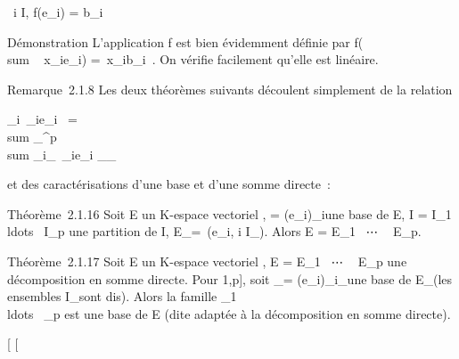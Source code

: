 \documentclass[]{article}
\begin{document}
\forall~i \in I, f(e\_i) = b\_i~

Démonstration L'application f est bien évidemment définie par
f(\\sum ~
x\_ie\_i) =\
\sum  x\_ib\_i~. On vérifie
facilement qu'elle est linéaire.

Remarque~2.1.8 Les deux théorèmes suivants découlent simplement de la
relation

\sum \_i\inI\alpha~\_ie\_i~ =
\\sum
\_^p\underbrace
\\sum
\_i\inI\_\jmath\alpha~\_ie\_i \_\inE\_\jmath

et des caractérisations d'une base et d'une somme directe~:

Théorème~2.1.16 Soit E un K-espace vectoriel ,  =
(e\_i)\_i\inI une base de E, I = I\_1
\cup\\ldots~ \cup
I\_p une partition de I, E\_\jmath =\
\mathrmVect(e\_i, i \in I\_\jmath). Alors
E = E\_1 \oplus~⋯ \oplus~ E\_p.

Théorème~2.1.17 Soit E un K-espace vectoriel , E = E\_1
\oplus~⋯ \oplus~ E\_p une décomposition en somme
directe. Pour \jmath \in {[}1,p{]}, soit \_\jmath =
(e\_i)\_i\inI\_\jmath une base de E\_\jmath (les
ensembles I\_\jmath sont dis\jmathoints). Alors la famille \_1
\cup\\ldots~
\cup\mathcal{E}\_p est une base de E (dite adaptée à la décomposition en
somme directe).

{[}
{[}
\end{document}
